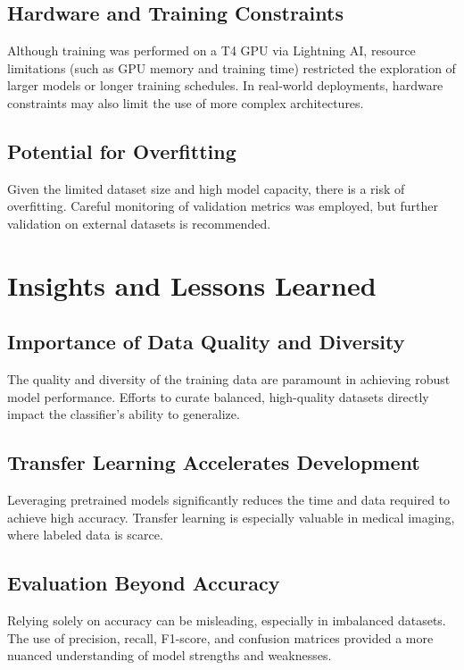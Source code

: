 \documentclass[a4paper,12pt]{report}
\begin{document}
\begin{spacing}{1.5}
        \subsection*{Hardware and Training Constraints}
        Although training was performed on a T4 GPU via Lightning AI, resource limitations (such as GPU memory and training time) restricted the exploration of larger models or longer training schedules. In real-world deployments, hardware constraints may also limit the use of more complex architectures.
        
        \subsection*{Potential for Overfitting}
        Given the limited dataset size and high model capacity, there is a risk of overfitting. Careful monitoring of validation metrics was employed, but further validation on external datasets is recommended.
    \newpage

    \section{Insights and Lessons Learned}
    
        \subsection*{Importance of Data Quality and Diversity}
        The quality and diversity of the training data are paramount in achieving robust model performance. Efforts to curate balanced, high-quality datasets directly impact the classifier’s ability to generalize.
        
        \subsection*{Transfer Learning Accelerates Development}
        Leveraging pretrained models significantly reduces the time and data required to achieve high accuracy. Transfer learning is especially valuable in medical imaging, where labeled data is scarce.
        
        \subsection*{Evaluation Beyond Accuracy}
        Relying solely on accuracy can be misleading, especially in imbalanced datasets. The use of precision, recall, F1-score, and confusion matrices provided a more nuanced understanding of model strengths and weaknesses.
        

\end{spacing}
\end{document}

